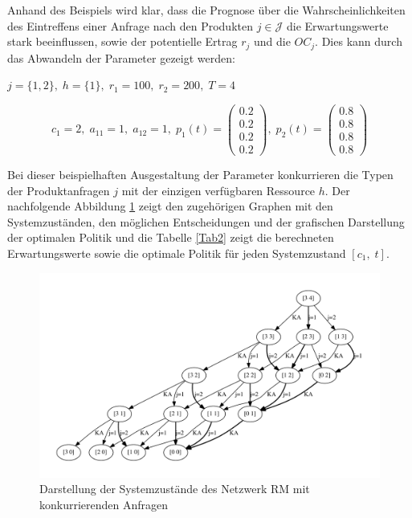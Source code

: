 Anhand des Beispiels wird klar, dass die Prognose über die Wahrscheinlichkeiten des Eintreffens einer Anfrage nach den Produkten $j\in\mathcal{J}$ die Erwartungswerte stark beeinflussen, sowie der potentielle Ertrag $r_{j}$ und die $OC_{j}$. Dies kann durch das Abwandeln der Parameter gezeigt werden:
\begin{center}
$j = \{1, 2\}, \; h = \{1\}, \; r_{1} = 100, \; r_{2} = 200, \; T=4$
\end{center}
\[
    c_{1}= 2, \;
    a_{11}=1, \;
     a_{12}=1, \;
     p_{1}(t)=\begin{pmatrix} 0.2\\ 0.2\\ 0.2\\ 0.2  \end{pmatrix}, \;
     p_{2}(t)=\begin{pmatrix} 0.8\\ 0.8\\ 0.8\\ 0.8  \end{pmatrix}
  \]
  
Bei dieser beispielhaften Ausgestaltung der Parameter konkurrieren die Typen der Produktanfragen $j$ mit der einzigen verfügbaren Ressource $h$. Der nachfolgende Abbildung \ref{B2} zeigt den zugehörigen Graphen mit den Systemzuständen, den möglichen Entscheidungen und der grafischen Darstellung der optimalen Politik und die Tabelle \ref{Tab2} zeigt die berechneten Erwartungswerte sowie die optimale Politik für jeden Systemzustand $[c_1,\;t]$.
\begin{figure}[h!]
  \begin{center}
    \includegraphics[width=120mm]{Bilder/Beispiel2.pdf}
    \caption{Darstellung der Systemzustände des Netzwerk RM mit konkurrierenden Anfragen}  \label{B2}
  \end{center}
\end{figure}

